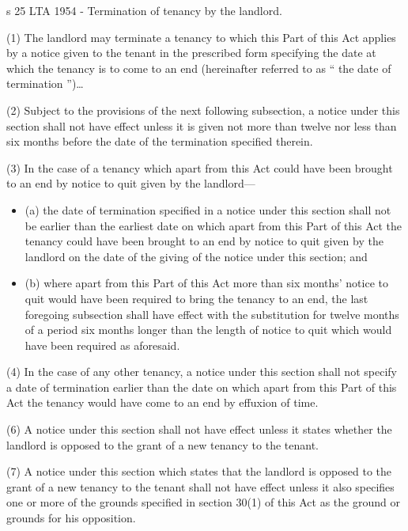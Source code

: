 \documentclass[
]{article}
\providecommand{\tightlist}{%
  \setlength{\itemsep}{0pt}\setlength{\parskip}{0pt}}
\newenvironment{env-2aad614f-6fd6-4025-876c-fcdbeae766fb}
{
    \savenotes\tcolorbox[blanker,breakable,left=5pt,borderline west={2pt}{-4pt}{green}]
}
{
    \endtcolorbox\spewnotes
}
\begin{document}
\begin{env-2aad614f-6fd6-4025-876c-fcdbeae766fb}

s 25 LTA 1954 - Termination of tenancy by the landlord.

(1) The landlord may terminate a tenancy to which this Part of this Act
applies by a notice given to the tenant in the prescribed form
specifying the date at which the tenancy is to come to an end
(hereinafter referred to as `` the date of termination '')\ldots{}

(2) Subject to the provisions of the next following subsection, a notice
under this section shall not have effect unless it is given not more
than twelve nor less than six months before the date of the termination
specified therein.

(3) In the case of a tenancy which apart from this Act could have been
brought to an end by notice to quit given by the landlord---

\begin{itemize}
\tightlist
\item
  (a) the date of termination specified in a notice under this section
  shall not be earlier than the earliest date on which apart from this
  Part of this Act the tenancy could have been brought to an end by
  notice to quit given by the landlord on the date of the giving of the
  notice under this section; and
\item
  (b) where apart from this Part of this Act more than six months'
  notice to quit would have been required to bring the tenancy to an
  end, the last foregoing subsection shall have effect with the
  substitution for twelve months of a period six months longer than the
  length of notice to quit which would have been required as aforesaid.
\end{itemize}

(4) In the case of any other tenancy, a notice under this section shall
not specify a date of termination earlier than the date on which apart
from this Part of this Act the tenancy would have come to an end by
effuxion of time.

(6) A notice under this section shall not have effect unless it states
whether the landlord is opposed to the grant of a new tenancy to the
tenant.

(7) A notice under this section which states that the landlord is
opposed to the grant of a new tenancy to the tenant shall not have
effect unless it also specifies one or more of the grounds specified in
section 30(1) of this Act as the ground or grounds for his opposition.


\end{env-2aad614f-6fd6-4025-876c-fcdbeae766fb}
\end{document}
